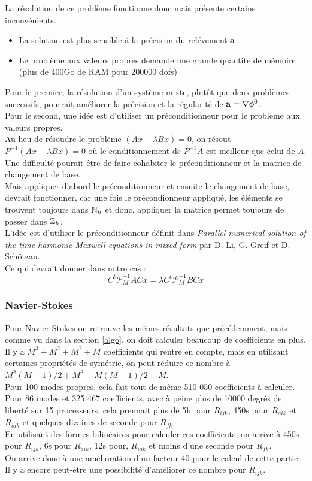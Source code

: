 \documentclass[a4paper,11pt]{article}
\begin{document}
La résolution de ce problème fonctionne donc mais présente certains inconvénients.
\begin{itemize}
\item
  La solution est plus sensible à la précision du relévement ${\mathbf{a}}$.
\item
  Le problème aux valeurs propres demande une grande quantité de mémoire (plus de 400Go de RAM pour 200000 dofs)
\end{itemize}
Pour le premier, la résolution d'un système mixte, plutôt que deux problèmes successifs, pourrait améliorer la précision et la régularité de ${\mathbf{a}} = {\nabla}\phi^0$.\\
Pour le second, une idée est d'utiliser un préconditionneur pour le problème aux valeurs propres.\\
Au lieu de résoudre le problème $(Ax-\lambda Bx) = 0$, on résout $P^{-1}(Ax-\lambda Bx) = 0$ où le conditionnement de $P^{-1}A$ est meilleur que celui de $A$. Une difficulté pourait être de faire cohabiter le préconditionneur et la matrice de changement de base.\\
Mais appliquer d'abord le préconditionneur et ensuite le changement de base, devrait fonctionner, car une fois le précondionneur appliqué, les éléments se trouvent toujours dans ${\mathbb{N}}_h$ et donc, appliquer la matrice permet toujours de passer dans ${\mathbb{Z}}_h$.\\

L'idée est d'utiliser le préconditionneur définit dans \textit{Parallel numerical solution of the time-harmonic Maxwell equations in mixed form} par D. Li, G. Greif et D. Schötzau.\\

Ce qui devrait donner dans notre cas :
\[ C^t \mathscr{P}_M^{-1}ACx = \lambda C^t \mathscr{P}_M^{-1}BCx \]

\subsubsection{Navier-Stokes}
Pour Navier-Stokes on retrouve les mêmes résultats que précédemment, mais comme vu dans la section \ref{algo}, on doit calculer beaucoup de coefficients en plus.\\
Il y a $M^3 + M^2 + M^2 + M$ coefficients qui rentre en compte, mais en utilisant certaines propriétés de symétrie, on peut réduire ce nombre à $M^2(M-1)/2 + M^2 + M(M-1)/2 + M$.\\
Pour 100 modes propres, cela fait tout de même 510 050 coefficients à calculer.
Pour 86 modes et 325 467 coefficients, avec à peine plus de 10000 degrés de liberté sur 15 processeurs, cela prennait plus de 5h pour $R_{ijk}$, 450s pour $R_{aik}$ et $R_{iak}$ et quelques dizaines de seconde pour $R_{fk}$.\\
En utilisant des formes bilinéaires pour calculer ces coefficients, on arrive à 450s pour $R_{ijk}$, 6s pour $R_{aik}$, 12s pour, $R_{iak}$ et moins d'une seconde pour $R_{fk}$.\\
On arrive donc à une amélioration d'un facteur 40 pour le calcul de cette partie. Il y a encore peut-être une possibilité d'améliorer ce nombre pour $R_{ijk}$.
\end{document}
